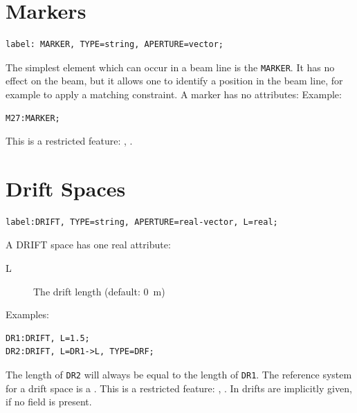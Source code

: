\section{Markers}
\label{sec:marker}
\begin{verbatim}
label: MARKER, TYPE=string, APERTURE=vector;
\end{verbatim}
The simplest element which can occur in a beam line is the \texttt{MARKER}.
It has no effect on the beam,
but it allows one to identify a position in the beam line,
for example to apply a matching constraint.
A marker has no attributes:
\noindent Example:
\begin{verbatim}
M27:MARKER;
\end{verbatim}
This is a restricted feature: \noopalt, \noopalcycl .

\section{Drift Spaces}
\label{sec:drift}
\begin{verbatim}
label:DRIFT, TYPE=string, APERTURE=real-vector, L=real;
\end{verbatim}
A DRIFT space has one real attribute:
\begin{description}
\item[L]
  The drift length (default: 0~m)
\end{description}
\noindent Examples:
\begin{verbatim}
DR1:DRIFT, L=1.5;
DR2:DRIFT, L=DR1->L, TYPE=DRF;
\end{verbatim}
The length of \texttt{DR2} will always be equal to the length of \texttt{DR1}.
The reference system for a drift space is a 
.
This is a restricted feature: \noopalt, \noopalcycl . In \opalt drifts are implicitly given, if no field is present.
